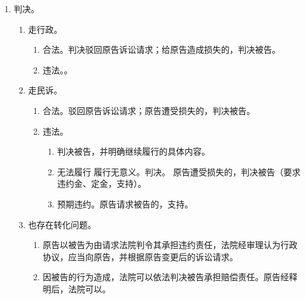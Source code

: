 \begin{enumerate}
\begin{enumerate}
\begin{enumerate}
                  \item {}，xx 法律规范确定。
                  \item 对行政机关行政协议等行政行为起讼的，xx 诉讼法及其司法解释确定。
                \end{enumerate}
        \end{enumerate}
  \item 判决。
        \begin{enumerate}
          \item 走行政。
                \begin{enumerate}
                  \item 合法。判决驳回原告诉讼请求；给原告造成损失的，判决被告。
                  \item 违法。。
                \end{enumerate}
          \item 走民诉。
                \begin{enumerate}
                  \item 合法。驳回原告诉讼请求；原告遭受损失的，判决被告。
                  \item 违法。
                        \begin{enumerate}
                          \item 判决被告，并明确继续履行的具体内容。
                          \item 无法履行 \hz 履行无意义。判决。
                                原告遭受损失的，判决被告（要求违约金、定金，支持）。
                          \item 预期违约。原告请求被告的，支持。
                        \end{enumerate}
                \end{enumerate}
          \item 也存在转化问题。
                \begin{enumerate}
                  \item 原告以被告为由请求法院判令其承担违约责任，法院经审理认为行政协议，应当向原告，并根据原告变更后的诉讼请求。
                  \item 因被告的行为造成，法院可以依法判决被告承担赔偿责任。原告经释明后，法院可以。
                \end{enumerate}
        \end{enumerate}
\end{enumerate}
